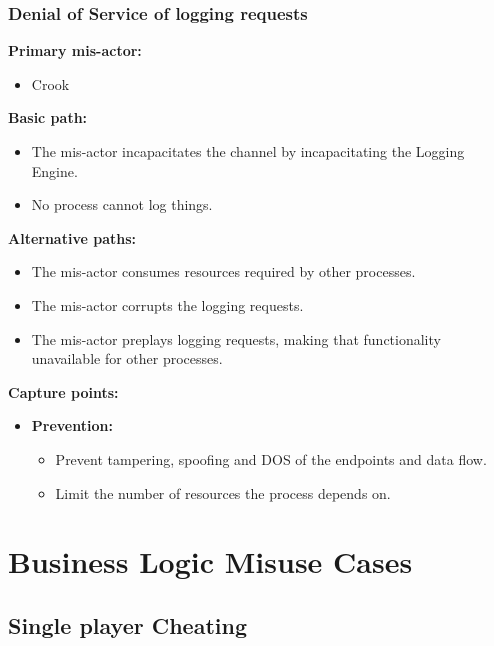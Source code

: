 \documentclass[a4paper,11pt]{report}
\begin{document}
\subsubsection{Denial of Service of logging requests}
\label{LoggingEngineFlowCasesD}
\textbf{Primary mis-actor:}
\begin{itemize}
\item Crook
\end{itemize}
\textbf{Basic path:}
\begin{itemize}
\item The mis-actor incapacitates the channel by incapacitating the Logging Engine.
\item No process cannot log things.
\end{itemize}
\textbf{Alternative paths:}
\begin{itemize}
\item The mis-actor consumes resources required by other processes.
\item The mis-actor corrupts the logging requests.
\item The mis-actor preplays logging requests, making that functionality unavailable for other processes.
\end{itemize}
\textbf{Capture points:}
\begin{itemize}
\item \textbf{Prevention:}
\begin{itemize}
\item Prevent tampering, spoofing and DOS of the endpoints and data flow.
\item Limit the number of resources the process depends on.
\end{itemize}
\end{itemize}

\section{Business Logic Misuse Cases}

\subsection{Single player Cheating}
\end{document}
